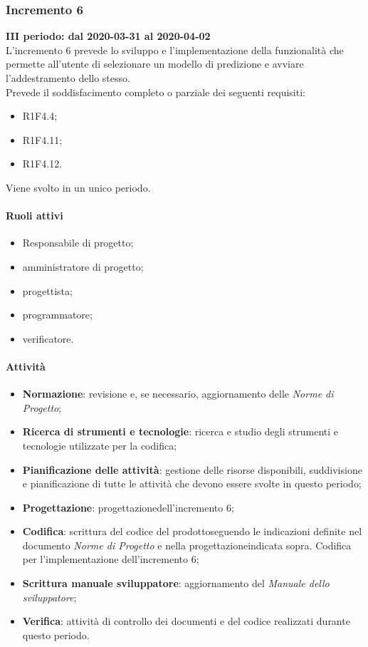 \subsubsection{Incremento 6}
\textbf{III periodo: dal 2020-03-31 al 2020-04-02} \\
L'incremento 6 prevede lo sviluppo e l'implementazione della funzionalità che permette all'utente di selezionare un modello di predizione e avviare l'addestramento dello stesso.
\\Prevede il soddisfacimento completo o parziale dei seguenti requisiti:
\begin{itemize}
	\item R1F4.4;
	\item R1F4.11;
	\item R1F4.12.
\end{itemize}
Viene svolto in un unico periodo.
\paragraph{Ruoli attivi}
\begin{itemize}
	\item Responsabile di progetto\glo;
	\item amministratore di progetto\glo;
	\item progettista;
	\item programmatore;
	\item verificatore.
\end{itemize}
\paragraph{Attività} 
\begin{itemize}
	\item \textbf{Normazione}: revisione e, se necessario, aggiornamento delle \textit{Norme di Progetto};
	\item \textbf{Ricerca di strumenti e tecnologie}: ricerca e studio degli strumenti e tecnologie utilizzate per la codifica;
	\item \textbf{Pianificazione delle attività}: gestione delle risorse disponibili, suddivisione e pianificazione di tutte le attività che devono essere svolte in questo periodo;
	\item \textbf{Progettazione}\glo: progettazione\glosp dell'incremento 6;  
	\item \textbf{Codifica}: scrittura del codice del prodotto\glosp seguendo le indicazioni definite nel documento \textit{Norme di Progetto} e nella progettazione\glosp indicata sopra. Codifica per l'implementazione dell'incremento 6;
	\item \textbf{Scrittura manuale sviluppatore}: aggiornamento del \textit{Manuale dello sviluppatore};
	\item \textbf{Verifica}: attività di controllo dei documenti e del codice realizzati durante questo periodo.
\end{itemize}
